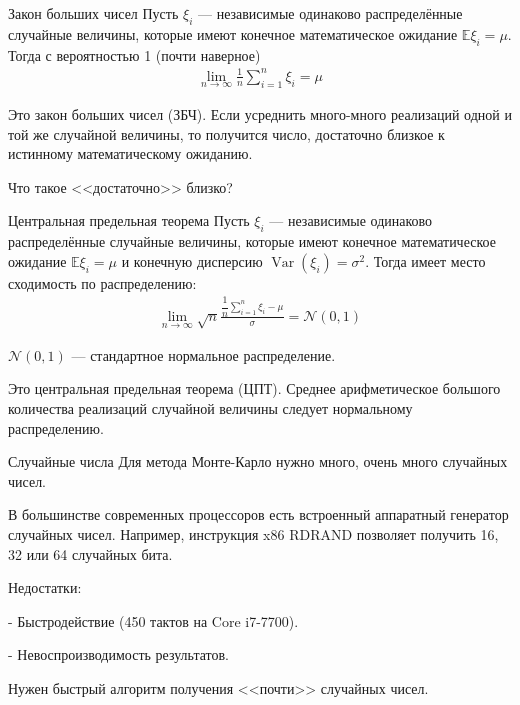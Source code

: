 \documentclass{beamer}
\begin{document}
\begin{frame}{Закон больших чисел}
\justify
Пусть $\xi_i$ --- независимые одинаково распределённые случайные величины, которые имеют конечное математическое ожидание $\mathbb{E}\xi_i=\mu$. Тогда с вероятностью 1 (почти наверное)
\begin{align*}
\lim_{n \to \infty} \frac{1}{n} \sum\limits_{i=1}^{n}\xi_i = \mu
\end{align*}

\justify
Это \alert{закон больших чисел} (ЗБЧ). Если усреднить много-много реализаций одной и той же случайной величины, то получится число, достаточно близкое к истинному математическому ожиданию.

\justify
Что такое <<достаточно>> близко?
\end{frame}



\begin{frame}{Центральная предельная теорема}
\justify
Пусть $\xi_i$ --- независимые одинаково распределённые случайные величины, которые имеют конечное математическое ожидание $\mathbb{E}\xi_i=\mu$ и конечную дисперсию $\operatorname{Var}(\xi_i) = \sigma^2$. Тогда имеет место сходимость по распределению:
\begin{align*}
\lim_{n \to \infty} \sqrt{n}\frac{\dfrac{1}{n}\sum\limits_{i=1}^{n}\xi_i - \mu}{\sigma} = \mathcal{N}(0, 1)
\end{align*}

\justify
$\mathcal{N}(0, 1)$ --- стандартное нормальное распределение.

\justify
Это \alert{центральная предельная теорема} (ЦПТ). Среднее арифметическое большого количества реализаций случайной величины следует нормальному распределению.
\end{frame}



\begin{frame}{Случайные числа}
\justify
Для метода Монте-Карло нужно много, очень много случайных чисел.

\justify
В большинстве современных процессоров есть встроенный аппаратный генератор случайных чисел. Например, инструкция x86 RDRAND позволяет получить 16, 32 или 64 случайных бита.

\justify
Недостатки:

- Быстродействие (450 тактов на Core i7-7700).

- Невоспроизводимость результатов.

\justify
Нужен быстрый алгоритм получения <<почти>> случайных чисел.
\end{frame}
\end{document}

